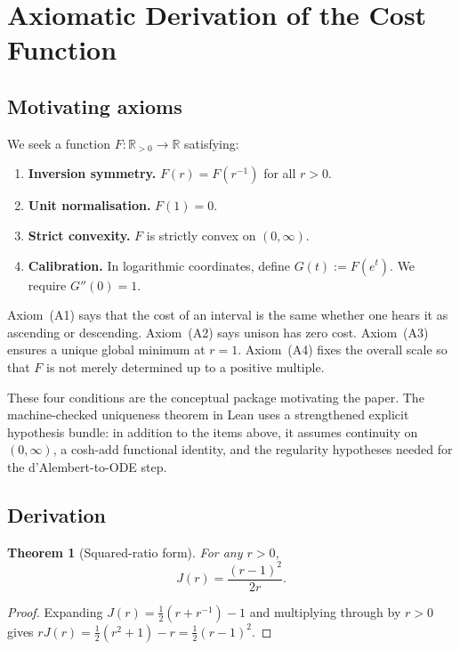 \documentclass[11pt,a4paper]{article}
\newtheorem{theorem}{Theorem}
\begin{document}
\section{Axiomatic Derivation of the Cost Function}
\label{sec:axioms}

\subsection{Motivating axioms}

We seek a function $F\colon\mathbb{R}_{>0}\to\mathbb{R}$ satisfying:

\begin{enumerate}[label=(A\arabic*)]
  \item \textbf{Inversion symmetry.}  $F(r)=F(r^{-1})$ for all
    $r>0$.
  \item \textbf{Unit normalisation.}  $F(1)=0$.
  \item \textbf{Strict convexity.}  $F$ is strictly convex on
    $(0,\infty)$.
  \item \textbf{Calibration.}  In logarithmic coordinates, define
    $G(t):=F(e^t)$.  We require $G''(0)=1$.
\end{enumerate}

\noindent Axiom~(A1) says that the cost of an interval is the same
whether one hears it as ascending or descending.  Axiom~(A2) says
unison has zero cost.  Axiom~(A3) ensures a unique global minimum at
$r=1$.  Axiom~(A4) fixes the overall scale so that $F$ is not merely
determined up to a positive multiple.

\medskip

\noindent These four conditions are the conceptual package motivating
the paper.  The machine-checked uniqueness theorem in Lean uses a
strengthened explicit hypothesis bundle: in addition to the items above,
it assumes continuity on $(0,\infty)$, a cosh-add functional identity,
and the regularity hypotheses needed for the d'Alembert-to-ODE step.

\subsection{Derivation}

\begin{theorem}[Squared-ratio form]
\label{thm:sq-form}
For any $r>0$,
\[
  J(r) = \frac{(r-1)^2}{2r}.
\]
\end{theorem}

\begin{proof}
Expanding $J(r)=\tfrac{1}{2}(r+r^{-1})-1$ and multiplying through by
$r>0$ gives $rJ(r)=\tfrac{1}{2}(r^2+1)-r=\tfrac{1}{2}(r-1)^2$.
\end{proof}
\end{document}
